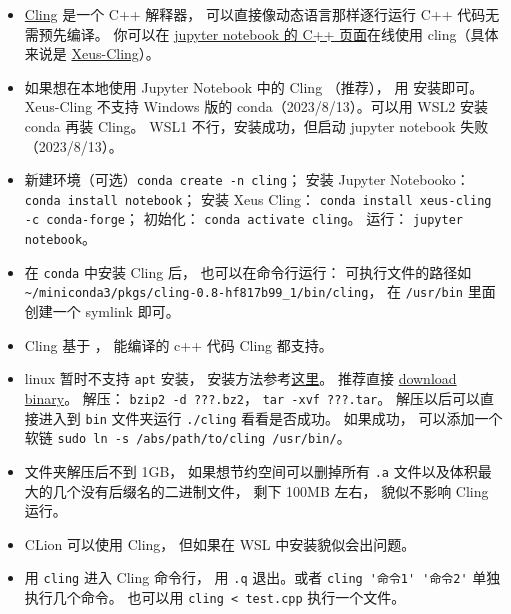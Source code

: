 
\begin{issues}
\issueDraft
\end{issues}


\begin{itemize}
\item \href{https://root.cern/cling/}{Cling} 是一个 C++ 解释器， 可以直接像动态语言那样逐行运行 C++ 代码无需预先编译。
你可以在 \href{https://jupyter.org/try}{jupyter notebook 的 C++ 页面}在线使用 cling（具体来说是 \href{https://xeus-cling.readthedocs.io/en/latest/index.html}{Xeus-Cling}）。
\item 如果想在本地使用 Jupyter Notebook 中的 Cling （推荐）， 用  安装即可。 Xeus-Cling 不支持 Windows 版的 conda（2023/8/13）。可以用 WSL2 安装 conda 再装 Cling。 WSL1 不行，安装成功，但启动 jupyter notebook 失败（2023/8/13）。
\item 新建环境（可选）\verb|conda create -n cling|； 安装 Jupyter Notebooko：\verb|conda install notebook|； 安装 Xeus Cling： \verb|conda install xeus-cling -c conda-forge|； 初始化： \verb|conda activate cling|。 运行： \verb|jupyter notebook|。
\item 在 \verb|conda| 中安装 Cling 后， 也可以在命令行运行： 可执行文件的路径如 \verb|~/miniconda3/pkgs/cling-0.8-hf817b99_1/bin/cling|， 在 \verb|/usr/bin| 里面创建一个 symlink 即可。
\item Cling 基于 ，  能编译的 c++ 代码 Cling 都支持。
\item linux 暂时不支持 \verb|apt| 安装， 安装方法参考\href{https://kaustubh13.medium.com/how-to-install-cling-on-linux-or-wsl-8125798ed9b9}{这里}。 推荐直接 \href{https://root.cern/download/cling/}{download binary}。 解压： \verb|bzip2 -d ???.bz2|， \verb|tar -xvf ???.tar|。 解压以后可以直接进入到 \verb|bin| 文件夹运行 \verb|./cling| 看看是否成功。 如果成功， 可以添加一个软链 \verb|sudo ln -s /abs/path/to/cling /usr/bin/|。
\item 文件夹解压后不到 1GB， 如果想节约空间可以删掉所有 \verb|.a| 文件以及体积最大的几个没有后缀名的二进制文件， 剩下 100MB 左右， 貌似不影响 Cling 运行。
\item CLion 可以使用 Cling， 但如果在 WSL 中安装貌似会出问题。
\item 用 \verb|cling| 进入 Cling 命令行， 用 \verb|.q| 退出。或者 \verb|cling '命令1' '命令2'| 单独执行几个命令。 也可以用 \verb|cling < test.cpp| 执行一个文件。

\end{itemize}
